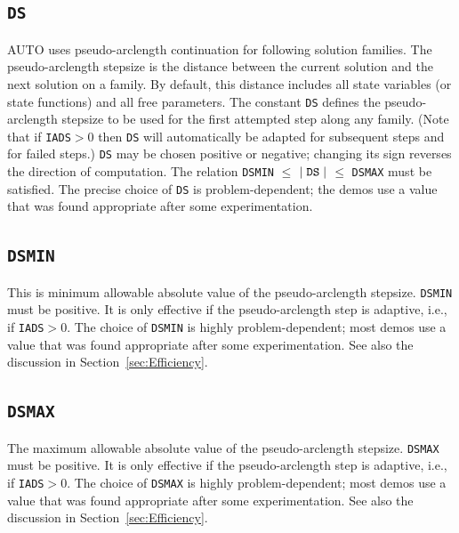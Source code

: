\documentclass[12pt]{report}
\def\abs#1{\mid#1\mid}
\begin{document}
\subsection{\tt DS}  \label{sec:DS}
 {\cal AUTO} uses pseudo-arclength continuation for following solution families.
 The pseudo-arclength stepsize is the distance between
 the current solution and the next solution on a family.
 By default, this distance includes all state variables
 (or state functions) and all free parameters.
 The constant {\tt DS} defines the pseudo-arclength stepsize to be used for the
 first attempted step along any family. 
 (Note that if {\tt IADS}$>$0 then {\tt DS} will automatically be adapted
 for subsequent steps and for failed steps.)
 {\tt DS} may be chosen positive or negative; changing its sign 
 reverses the direction of computation.
 The relation {\tt DSMIN} $\le$ $\abs {\tt DS}$ $\le$ {\tt DSMAX} must be satisfied.
 The precise choice of {\tt DS} is problem-dependent; the demos use a value 
 that was found appropriate after some experimentation.
 

\subsection{\tt DSMIN}  \label{sec:DSMIN}
 This is minimum allowable absolute value of the pseudo-arclength 
 stepsize. {\tt DSMIN} must be positive.
 It is only effective if the pseudo-arclength step is adaptive,
 i.e., if {\tt IADS}$>$0.
 The choice of {\tt DSMIN} is highly problem-dependent;
 most demos use a value that was found appropriate after some
 experimentation.
 See also the discussion in Section~\ref{sec:Efficiency}.

\subsection{\tt DSMAX}  \label{sec:DSMAX}
 The maximum allowable absolute value of the pseudo-arclength stepsize.
 {\tt DSMAX} must be positive.
 It is only effective if the pseudo-arclength step is adaptive,
 i.e., if {\tt IADS}$>$0.
 The choice of {\tt DSMAX} is highly problem-dependent; 
 most demos use a value that was found appropriate after some
 experimentation.
 See also the discussion in Section~\ref{sec:Efficiency}.
\end{document}
